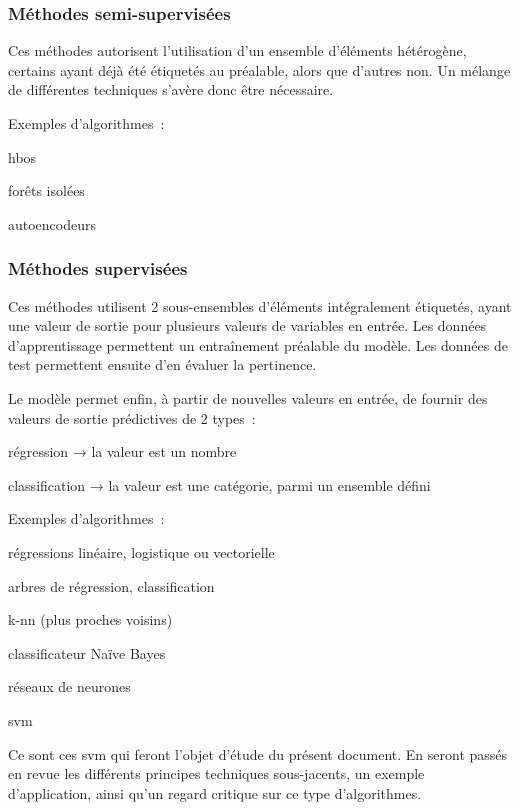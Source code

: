 \subsubsection{Méthodes semi-supervisées}

Ces méthodes autorisent l’utilisation d’un ensemble d’éléments hétérogène,
certains ayant déjà été étiquetés au préalable, alors que d’autres non.
Un mélange de différentes techniques s’avère donc être nécessaire.

Exemples d’algorithmes :
\begin{itmz}
\item{\gls{hbos}}
\item{forêts isolées}
\item{autoencodeurs}
\end{itmz}

\subsubsection{Méthodes supervisées}

Ces méthodes utilisent 2 sous-ensembles d’éléments intégralement étiquetés,
ayant une valeur de sortie pour plusieurs valeurs de variables en entrée.
Les données d’apprentissage permettent un entraînement préalable du modèle.
Les données de test permettent ensuite d’en évaluer la pertinence.

Le modèle permet enfin, à partir de nouvelles valeurs en entrée,
de fournir des valeurs de sortie prédictives de 2 types :
\begin{itmz}
\item{régression → la valeur est un nombre}
\item{classification → la valeur est une catégorie, parmi un ensemble défini}
\end{itmz}

Exemples d’algorithmes :
\begin{itmz}
\item{régressions linéaire, logistique ou vectorielle}
\item{arbres de régression, classification}
\item{k-\gls{nn} (plus proches voisins)}
\item{classificateur Naïve Bayes}
\item{réseaux de neurones}
\item{\gls{svm}}
\end{itmz}

Ce sont ces \gls{svm} qui feront l’objet d’étude du présent document.
En seront passés en revue les différents principes techniques sous-jacents,
un exemple d’application, ainsi qu’un regard critique sur ce type d’algorithmes.

\pagebreak
